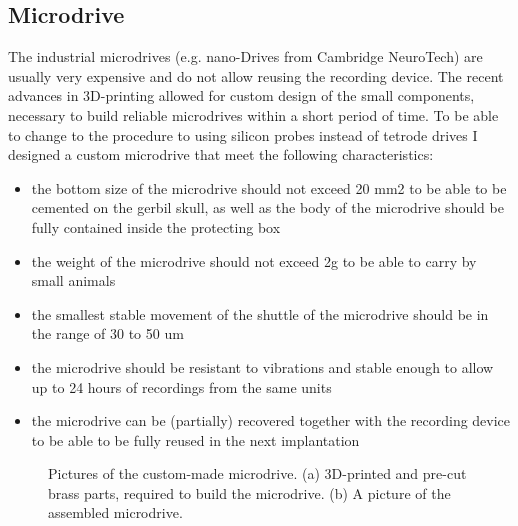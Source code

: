\subsection{Microdrive}

The industrial microdrives (e.g. nano-Drives from Cambridge NeuroTech) are usually very expensive and do not allow reusing the recording device. The recent advances in 3D-printing allowed for custom design of the small components, necessary to build reliable microdrives within a short period of time. To be able to change to the procedure to using silicon probes instead of tetrode drives I designed a custom microdrive that meet the following characteristics:

\begin{itemize}
    \item the bottom size of the microdrive should not exceed 20 mm2 to be able to be cemented on the gerbil skull, as well as the body of the microdrive should be fully contained inside the protecting box
    \item the weight of the microdrive should not exceed 2g to be able to carry by small animals
    \item the smallest stable movement of the shuttle of the microdrive should be in the range of 30 to 50 um
    \item the microdrive should be resistant to vibrations and stable enough to allow up to 24 hours of recordings from the same units
    \item the microdrive can be (partially) recovered together with the recording device to be able to be fully reused in the next implantation
\end{itemize}

\begin{figure}
\captionsetup{format=plain}
\caption[Microdrive]{
Pictures of the custom-made microdrive. (a) 3D-printed and pre-cut brass parts, required to build the microdrive. (b) A picture of the assembled microdrive.
}
\label{fig:F29_microdrive}
\end{figure}

